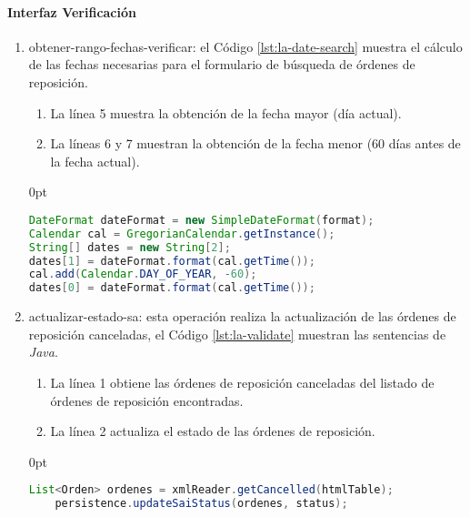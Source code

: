 \paragraph{\indent Interfaz Verificación}
\begin{enumerate}
	\item obtener-rango-fechas-verificar: el Código \ref{lst:la-date-search} muestra el cálculo de las fechas necesarias para el formulario de búsqueda de órdenes de reposición.
	\begin{enumerate}
		\item La línea 5 muestra la obtención de la fecha mayor (día actual).
		\item La líneas 6 y 7 muestran la obtención de la fecha menor (60 días antes de la fecha actual).
	\end{enumerate}
	\begin{adjustwidth}{\listingfixwidth}{0pt}
	\begin{lstlisting}[language=Java, caption={Cálculo del rango de fechas para buscar órdenes de reposición canceladas.}, captionpos=b, label={lst:la-date-search}]
DateFormat dateFormat = new SimpleDateFormat(format);
Calendar cal = GregorianCalendar.getInstance();
String[] dates = new String[2];
dates[1] = dateFormat.format(cal.getTime());
cal.add(Calendar.DAY_OF_YEAR, -60);
dates[0] = dateFormat.format(cal.getTime());
	\end{lstlisting}
	\end{adjustwidth}
	\item actualizar-estado-sa: esta operación realiza la actualización de las órdenes de reposición canceladas, el Código \ref{lst:la-validate} muestran las sentencias de \textit{Java}.
	\begin{enumerate}
		\item La línea 1 obtiene las órdenes de reposición canceladas del listado de órdenes de reposición encontradas.
		\item La línea 2 actualiza el estado de las órdenes de reposición.
	\end{enumerate}
	\begin{adjustwidth}{\listingfixwidth}{0pt}
	\begin{lstlisting}[language=Java, caption={Actualización de órdenes de reposición canceladas.}, captionpos=b, label={lst:la-validate}]
	List<Orden> ordenes = xmlReader.getCancelled(htmlTable);
	persistence.updateSaiStatus(ordenes, status);
	\end{lstlisting}
	\end{adjustwidth}
\end{enumerate}
